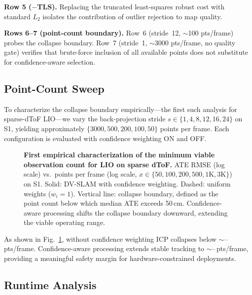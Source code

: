 \textbf{Row 5 ($-$TLS).}
Replacing the truncated least-squares robust cost with standard $L_2$
isolates the contribution of outlier rejection to map quality.

\textbf{Rows 6--7 (point-count boundary).}
Row~6 (stride~12, ${\sim}$100 pts/frame) probes the collapse boundary.
Row~7 (stride~1, ${\sim}$3000 pts/frame, no quality gate) verifies that
brute-force inclusion of all available points does not substitute for
confidence-aware selection.

\subsection{Point-Count Sweep}
\label{sec:sweep}

To characterize the collapse boundary empirically---the first such analysis
for sparse-dToF LIO---we vary the back-projection stride
$s \in \{1, 4, 8, 12, 16, 24\}$ on S1, yielding approximately
$\{3000, 500, 200, 100, 50\}$ points per frame.
Each configuration is evaluated with confidence weighting ON and OFF.

\begin{figure}[t]
    \centering
    \caption{%
    \textbf{First empirical characterization of the minimum viable
    observation count for LIO on sparse dToF.}
    ATE RMSE (log scale) vs.\ points per frame (log scale,
    $x \in \{50, 100, 200, 500, 1\text{K}, 3\text{K}\}$) on S1.
    Solid: DV-SLAM with confidence weighting.
    Dashed: uniform weights ($w_i = 1$).
    Vertical line: collapse boundary, defined as the point count below which
    median ATE exceeds 50\,cm.
    Confidence-aware processing shifts the collapse boundary downward,
    extending the viable operating range.%
    }
    \label{fig:sweep}
\end{figure}

As shown in Fig.~\ref{fig:sweep}, without confidence weighting ICP collapses
below ${\sim}$--\,pts/frame.
Confidence-aware processing extends stable tracking to ${\sim}$--\,pts/frame,
providing a meaningful safety margin for hardware-constrained deployments.

\subsection{Runtime Analysis}
\label{sec:runtime}

